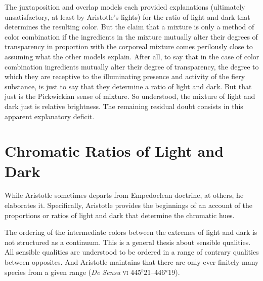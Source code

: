The juxtaposition and overlap models each provided explanations (ultimately unsatisfactory, at least by Aristotle's lights) for the ratio of light and dark that determines the resulting color. But the claim that a mixture is only a method of color combination if the ingredients in the mixture mutually alter their degrees of transparency in proportion with the corporeal mixture comes perilously close to assuming what the other models explain. After all, to say that in the case of color combination ingredients mutually alter their degree of transparency, the degree to which they are receptive to the illuminating presence and activity of the fiery substance, is just to say that they determine a ratio of light and dark. But that just is the Pickwickian sense of mixture. So understood, the mixture of light and dark just is relative brightness. The remaining residual doubt consists in this apparent explanatory deficit. 




\section{Chromatic Ratios of Light and Dark} %
\label{sec:chromatic_ratios_of_light_and_dark}

While Aristotle sometimes departs from Empedoclean doctrine, at others, he elaborates it. Specifically, Aristotle provides the beginnings of an account of the proportions or ratios of light and dark that determine the chromatic hues.

The ordering of the intermediate colors between the extremes of light and dark is not structured as a continuum. This is a general thesis about sensible qualities. All sensible qualities are understood to be ordered in a range of contrary qualities between opposites. And Aristotle maintains that there are only ever finitely many species from a given range (\emph{De Sensu} \textsc{vi} 445\( ^{b} \)21--446\( ^{a} \)19). 

